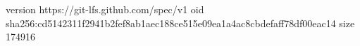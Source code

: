version https://git-lfs.github.com/spec/v1
oid sha256:cd5142311f2941b2fef8ab1aec188ce515e09ea1a4ac8cbdefaff78df00eac14
size 174916
